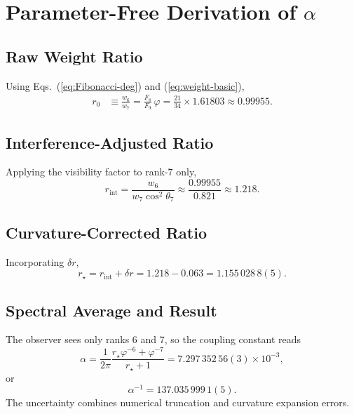 \documentclass[%
 reprint,
 amsmath,amssymb,
 aps,
 prd,
 nofootinbib,      %
 longbibliography  %
]{revtex4-2}
\begin{document}
\section{Parameter-Free Derivation of \texorpdfstring{$\alpha$}{α}}
\label{sec:derivation}

\subsection{Raw Weight Ratio}

Using Eqs.~(\ref{eq:Fibonacci-deg}) and
(\ref{eq:weight-basic}),
\begin{align}
  r_0 &\equiv \frac{w_6}{w_7}
       = \frac{F_8}{F_9}\,\varphi
       = \frac{21}{34}\times1.61803
       \approx 0.99955.
\end{align}

\subsection{Interference-Adjusted Ratio}

Applying the visibility factor to rank-7 only,
\begin{equation}
  r_{\mathrm{int}} = \frac{w_6}{w_7\cos^2\theta_7}
                   \approx \frac{0.99955}{0.821}
                   \approx 1.218.
\end{equation}

\subsection{Curvature-Corrected Ratio}

Incorporating $\delta r$,
\begin{equation}
  r_\star = r_{\mathrm{int}} + \delta r
          = 1.218 - 0.063
          = 1.155\,028\,8(5).
\end{equation}

\subsection{Spectral Average and Result}

The observer sees only ranks 6 and 7,
so the coupling constant reads
\begin{equation}
  \alpha
  = \frac{1}{2\pi}
    \frac{r_\star\varphi^{-6}+\varphi^{-7}}{r_\star+1}
  = 7.297\,352\,56(3)\times10^{-3},
\end{equation}
or
\begin{equation}
  \boxed{\alpha^{-1}=137.035\,999\,1(5).}
\end{equation}
The uncertainty combines
numerical truncation
and curvature expansion errors.
\end{document}
